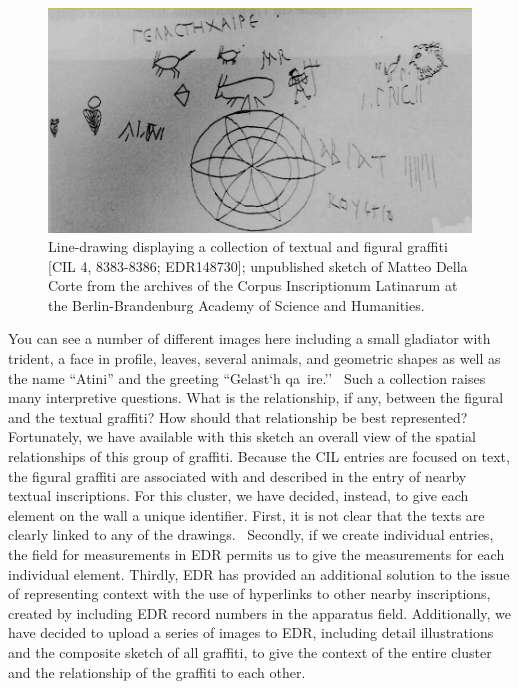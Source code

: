 \documentclass[amsthm,ebook]{saparticle}
\begin{document}
\begin{figure}[!bp]
\centering
 \includegraphics[width=\columnwidth]{EAGLE2016BenefielSypniewski-img004.jpg}
\caption{Line-drawing displaying a collection of textual and figural graffiti [CIL 4, 8383-8386; EDR148730]; unpublished
sketch of Matteo Della Corte from the archives of the Corpus Inscriptionum Latinarum at the Berlin-Brandenburg Academy
of Science and Humanities.}
\label{fig:4}
\end{figure}




You can see a number of different images here including a small gladiator with trident, a face in profile, leaves,
several animals, and geometric shapes as well as the name ``Atini'' and the greeting ``\textgreek{Gelast`h qa~ire.''
}\ Such a collection raises many interpretive questions. What is the relationship, if any, between the figural and the
textual graffiti? How should that relationship be best represented? Fortunately, we have available with this sketch an
overall view of the spatial relationships of this group of graffiti. Because the CIL entries are focused on text, the
figural graffiti are associated with and described in the entry of nearby textual inscriptions. For this cluster, we
have decided, instead, to give each element on the wall a unique identifier. First, it is not clear that the texts are
clearly linked to any of the drawings. \ Secondly, if we create individual entries, the field for measurements in EDR
permits us to give the measurements for each individual element. Thirdly, EDR has provided an additional solution to
the issue of representing context with the use of hyperlinks to other nearby inscriptions, created by including EDR
record numbers in the apparatus field. Additionally, we have decided to upload a series of images to EDR, including
detail illustrations and the composite sketch of all graffiti, to give the context of the entire cluster and the
relationship of the graffiti to each other.
\end{document}
